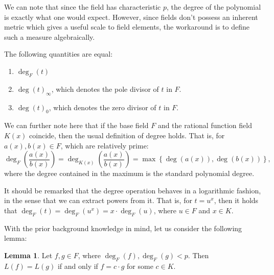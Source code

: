\documentclass{article}
\theoremstyle{definition}
\newtheorem{lemma}{Lemma}
\newcommand{\6}{\mathbf}
\newcommand{\7}{\mathcal}
\newcommand{\free}[1]{{\textcolor{red}{#1}}}
\begin{document}
We can note that since the field has characteristic $p$, the degree of the polynomial is exactly what one would expect. However, since fields don't possess an inherent metric which gives a useful scale to field elements, the workaround is to define such a measure algebraically. 

The following quantities are equal:

\begin{enumerate}
\item $\deg_F(t)$
\item $\deg(t)_{\infty}$, which denotes the pole divisor of $t$ in $F$.
\item $\deg(t)_0$, which denotes the zero divisor of $t$ in $F$.
\end{enumerate}

We can further note here that if the base field $F$ and the rational function field $K(x)$ coincide, then the usual definition of degree holds. That is, for $a(x),b(x) \in F$, which are relatively prime:
$$\deg_{F} \left( \frac{a(x)}{b(x)} \right) = \deg_{K(x)} \left( \frac{a(x)}{b(x)}\right) = \max \left \{ \deg(a(x)), \deg(b(x))\right \},$$
where the degree contained in the maximum is the standard polynomial degree.

\medskip 

It should be remarked that the degree operation behaves in a logarithmic fashion, in the sense that we can extract powers from it. 
That is, for $t = u^x$, then it holds that $\deg_F(t) = \deg_F(u^x) = x \cdot \deg_F(u)$, where $u \in F$ and $x \in K$. %

\medskip 

With the prior background knowledge in mind, let us consider the following lemma:
\begin{lemma} Let $f,g \in F$, where $\deg_F(f), \deg_F(g) < p$. Then $L(f) = L(g)$ if and only if $f = c \cdot g$ for some $c \in K$.
\end{lemma}
\end{document}
